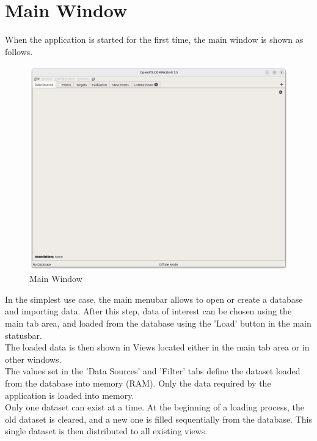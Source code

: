 \section{Main Window}
\label{sec:ui_main_window} 

When the application is started for the first time, the main window is shown as follows. 

\begin{figure}[H]
  \hspace*{-2.5cm}
    \includegraphics[width=19cm]{figures/main_window.png}
  \caption{Main Window}
\end{figure}

In the simplest use case, the main menubar allows to open or create a database and importing data. 
After this step, data of interest can be chosen using the main tab area, and loaded from the database using the 'Load' button in the main statusbar. \\

The loaded data is then shown in Views located either in the main tab area or in other windows. \\

The values set in the 'Data Sources' and 'Filter' tabs define the dataset loaded from the database into memory (RAM). Only the data required by the application is loaded into memory.\\

Only one dataset can exist at a time. At the beginning of a loading process, the old dataset is cleared, and a new one is filled sequentially from the database. This single dataset is then distributed to all existing views. \\

